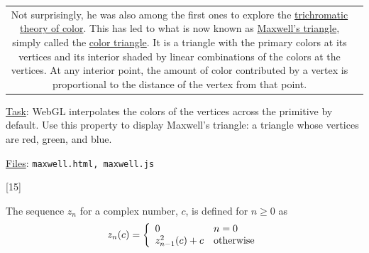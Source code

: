 \documentclass[addpoints]{exam}
\begin{document}
\begin{questions}
\begin{tabularx}{\linewidth}{cX}
      Not surprisingly, he was also among the first ones to explore the \href{https://spie.org/publications/pm105_32_maxwell_triangle?SSO=1}{trichromatic theory of color}. This has led to what is now known as \href{https://homepages.abdn.ac.uk/npmuseum/article/Maxwell/Legacy/MaxTri.html}{Maxwell's triangle}, simply called the \href{https://en.wikipedia.org/wiki/Color_triangle}{color triangle}. It is a triangle with the primary colors at its vertices and its interior shaded by linear combinations of the colors at the vertices. At any interior point, the amount of color contributed by a vertex is proportional to the distance of the vertex from that point.
  \end{tabularx}

  \underline{Task}: WebGL interpolates the colors of the vertices across the primitive by default. Use this property to display Maxwell's triangle: a triangle whose vertices are red, green, and blue.
  
  \underline{Files}: \texttt{maxwell.html, maxwell.js}
  
[15]

  The sequence $z_n$ for a complex number, $c$, is defined for $n\geq 0$ as
  \[
    z_n(c) = \left\{
      \begin{array}{l@{\quad}l}
        0 & n = 0\\
        z^2_{n-1}(c)+c & \textrm{otherwise}
      \end{array}
    \right.
  \]


\end{questions}
\end{document}
